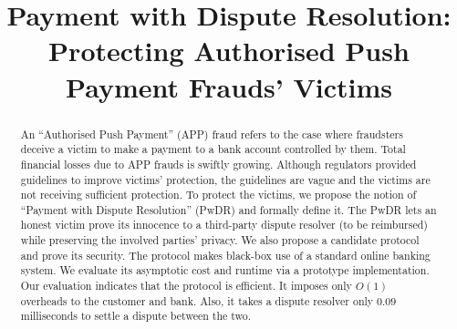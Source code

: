 \documentclass[orivec]{llncs}
\begin{document}
\title{Payment with Dispute Resolution: \\Protecting Authorised Push Payment Frauds' Victims}
\author{}
\institute{}

\date{}
\maketitle{}


\begin{abstract}
An ``Authorised Push Payment'' (APP) fraud refers to the case where  fraudsters deceive a victim  to make  a payment  to a bank account controlled by them.  Total financial losses due to  APP frauds is swiftly growing. Although  regulators   provided guidelines to  improve victims’ protection, the guidelines are  vague and  the victims are not receiving sufficient protection. To protect the  victims,  we propose the notion of ``Payment with Dispute Resolution'' (PwDR) and formally define it. The PwDR lets an honest victim  prove its innocence to a third-party dispute resolver  (to be reimbursed) while preserving the involved parties' privacy. We also propose a  candidate protocol  and  prove its security. The protocol  makes black-box use of a standard online banking system. We evaluate its    asymptotic cost and   runtime  via a prototype implementation. Our evaluation indicates that the protocol is  efficient. It imposes only $O(1)$ overheads to the customer and bank.  Also, it takes  a dispute resolver  only $0.09$ milliseconds to  settle a dispute between the two.
\end{abstract}












\appendix






\end{document}
